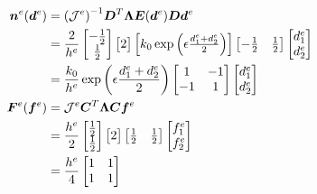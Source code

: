 \begin{equation}
\begin{aligned}
    \bv{n}^e(\bv{d}^e) &= {(\mathcal{J}^e)}^{-1} \bt{D}^T \bt{\Lambda} \bt{E}(\bv{d}^e) \bt{D} \bv{d}^e \\
    &=  \frac{2}{h^e} 
        \begin{bmatrix} -\frac{1}{2} \\ \frac{1}{2} \end{bmatrix} 
        \begin{bmatrix} 2 \end{bmatrix} 
        \begin{bmatrix} k_0 \exp \left(\epsilon \frac{d_1^e + d_2^e}{2}\right) \end{bmatrix} 
        \begin{bmatrix} -\frac{1}{2} & \frac{1}{2} \end{bmatrix} 
        \begin{bmatrix} d_1^e \\ d_2^e \end{bmatrix} \\
    &=  \frac{k_0}{h^e} \exp \left(\epsilon \frac{d_1^e + d_2^e}{2}\right) 
        \begin{bmatrix} 1 & -1 \\ -1 & 1 \end{bmatrix} 
        \begin{bmatrix} d_1^e \\ d_2^e \end{bmatrix}\\
    \bv{F}^e(\bv{f}^e) &= \mathcal{J}^e \bt{C}^T \bt{\Lambda} \bt{C} \bv{f}^e \\
    &=  \frac{h^e}{2}
        \begin{bmatrix} \frac{1}{2} \\ \frac{1}{2} \end{bmatrix}
        \begin{bmatrix} 2 \end{bmatrix} 
        \begin{bmatrix} \frac{1}{2} & \frac{1}{2} \end{bmatrix}
        \begin{bmatrix} f_1^e \\ f_2^e \end{bmatrix} \\
    & = \frac{h^e}{4} 
        \begin{bmatrix} 1 & 1 \\ 1 & 1 \end{bmatrix} 

\end{aligned}
\end{equation}
